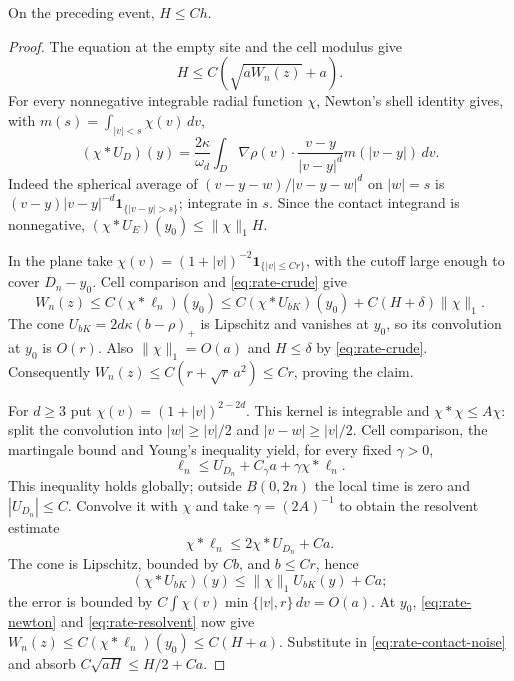 \begin{lemma}\label{lem:rate-contact}
On the preceding event, $H\le Ch$.
\end{lemma}
\begin{proof}
The equation at the empty site and the cell modulus give
\begin{equation}\label{eq:rate-contact-noise}
 H\le C(\sqrt{aW_n(z)}+a).
\end{equation}
For every nonnegative integrable radial function $\chi$, Newton's shell
identity gives, with $m(s)=\int_{|v|<s}\chi(v)\,dv$,
\begin{equation}\label{eq:rate-newton}
 (\chi*U_D)(y)=\frac{2\kappa}{\omega_d}\int_D
 \nabla\rho(v)\cdot\frac{v-y}{|v-y|^d}m(|v-y|)\,dv.
\end{equation}
Indeed the spherical average of $(v-y-w)/|v-y-w|^d$ on $|w|=s$
is $(v-y)|v-y|^{-d}\mathbf1_{\{|v-y|>s\}}$; integrate in $s$.
Since the contact integrand is nonnegative,
$(\chi*U_E)(y_0)\le\|\chi\|_1H$.

In the plane take $\chi(v)=(1+|v|)^{-2}\mathbf1_{\{|v|\le Cr\}}$,
with the cutoff large enough to cover $D_n-y_0$.
Cell comparison and \eqref{eq:rate-crude} give
\[
 W_n(z)\le C(\chi*\ell_n)(y_0)
 \le C(\chi*U_{bK})(y_0)+C(H+\delta)\|\chi\|_1.
\]
The cone $U_{bK}=2d\kappa(b-\rho)_+$ is Lipschitz and vanishes at
$y_0$, so its convolution at $y_0$ is $O(r)$. Also
$\|\chi\|_1=O(a)$ and $H\le\delta$ by \eqref{eq:rate-crude}.
Consequently $W_n(z)\le C(r+\sqrt r\,a^2)\le Cr$, proving the claim.

For $d\ge3$ put $\chi(v)=(1+|v|)^{2-2d}$. This kernel is integrable
and $\chi*\chi\le A\chi$: split the convolution into
$|w|\ge|v|/2$ and $|v-w|\ge|v|/2$. Cell comparison, the martingale
bound and Young's inequality yield, for every fixed $\gamma>0$,
\[
 \ell_n\le U_{D_n}+C_\gamma a+\gamma\chi*\ell_n.
\]
This inequality holds globally; outside $B(0,2n)$ the local time is zero
and $|U_{D_n}|\le C$. Convolve it with $\chi$ and take
$\gamma=(2A)^{-1}$ to obtain the resolvent estimate
\begin{equation}\label{eq:rate-resolvent}
 \chi*\ell_n\le2\chi*U_{D_n}+Ca.
\end{equation}
The cone is Lipschitz, bounded by $Cb$, and $b\le Cr$, hence
\begin{equation}\label{eq:rate-cone-convolution}
 (\chi*U_{bK})(y)\le\|\chi\|_1 U_{bK}(y)+Ca;
\end{equation}
the error is bounded by $C\int\chi(v)\min\{|v|,r\}\,dv=O(a)$.
At $y_0$, \eqref{eq:rate-newton} and \eqref{eq:rate-resolvent} now give
$W_n(z)\le C(\chi*\ell_n)(y_0)\le C(H+a)$.
Substitute in \eqref{eq:rate-contact-noise} and absorb
$C\sqrt{aH}\le H/2+Ca$.
\end{proof}

